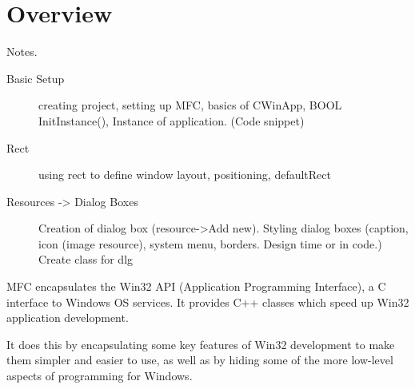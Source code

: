 \section{Overview}
Notes.
\begin{description}
    \item[Basic Setup] creating project, setting up MFC, basics of CWinApp, BOOL InitInstance(), Instance of application. (Code snippet)
    \item[Rect] using rect to define window layout, positioning, defaultRect
    \item[Resources -> Dialog Boxes] Creation of dialog box (resource->Add new). Styling dialog boxes (caption, icon (image resource), system menu, borders. Design time or in code.) Create class for dlg 
\end{description}

MFC encapsulates the Win32 API (Application Programming Interface), a C interface to Windows OS services. It provides C++ classes which speed up Win32 application development.

It does this by encapsulating some key features of Win32 development to make them simpler and easier to use, as well as by hiding some of the more low-level aspects of programming for Windows.


